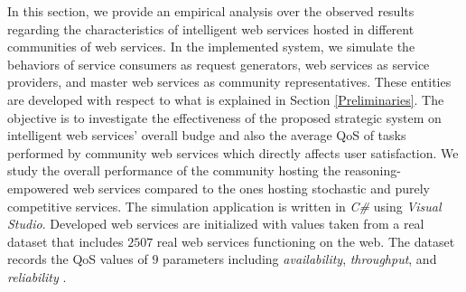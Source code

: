 \documentclass[runningheads,a4paper]{llncs}
\begin{document}
In this section, we provide an empirical analysis over the
observed results regarding the characteristics of intelligent web
services hosted in different communities of web services. In the
implemented system, we simulate the behaviors of service consumers
as request generators, web services as service providers, and
master web services as community representatives. These entities
are developed with respect to what is explained in Section
\ref{Preliminaries}. The objective is to investigate the
effectiveness of the proposed strategic system on intelligent
web services' overall budge and also the average QoS of tasks performed by 
community web services which directly affects user satisfaction. 
We study the overall performance of the community hosting the
reasoning-empowered web services compared to the ones hosting
stochastic and purely competitive services. The simulation
application is written in \textit{C\#} using \textit{Visual Studio}. 
Developed web services are initialized with values taken
from a real dataset that includes $2507$ real web services
functioning on the web. The dataset records the QoS values of $9$
parameters including \textit{availability}, \textit{throughput},
and
\textit{reliability} \cite{Almasri}.  %
\end{document}
